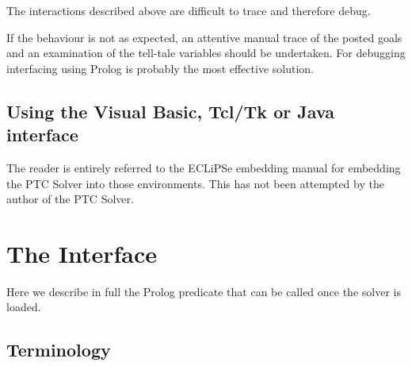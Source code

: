 \documentclass{article}
\begin{document}
The interactions described above are difficult to trace and therefore debug.

If the behaviour is not as expected, an attentive manual trace of the posted
goals and an examination of the tell-tale variables
should be undertaken. For debugging interfacing using Prolog is probably the most
effective solution.

\subsection{Using the Visual Basic, Tcl/Tk or Java interface}

The reader is entirely referred to the ECLiPSe embedding manual for embedding
the PTC Solver into those environments. This has not been attempted by
the author of the PTC Solver.

\section{The Interface}

\newcommand{\pro}[4]{\texttt{#1}          %

        \hspace{5mm} \parbox[t]{15cm}{#2}

        \vspace{\parskip}\hspace{5mm} \parbox[t]{15cm}{e.g. \texttt{#3} #4
\vspace{5mm}}
}

Here we describe in full the Prolog predicate that can be called once the solver
is loaded.

\subsection{Terminology}
\end{document}
